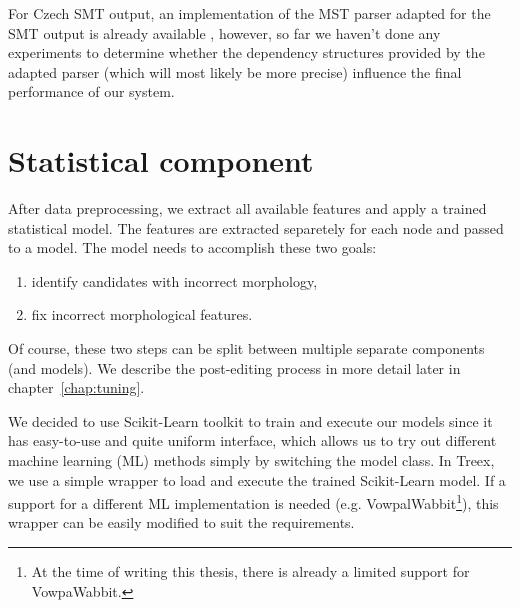 For Czech SMT output, an implementation of the MST parser adapted for the SMT output
is already available \citep{biblio:RoDuUsingParallel2012}, however, so far we haven't done any experiments
to determine whether the dependency structures provided by the adapted parser (which
will most likely be more precise) influence the final performance of our system.



\section{Statistical component}

After data preprocessing, we extract all available features and
apply a trained statistical model. The features are extracted separetely for each node and passed
to a model. The model needs to accomplish these two goals:
\begin{enumerate}
    \item identify candidates with incorrect morphology,
    \item fix incorrect morphological features.
\end{enumerate}
Of course, these two steps can be split between multiple separate components (and models).
We describe the post-editing process in more detail later in chapter~\ref{chap:tuning}.

We decided to use Scikit-Learn \citep{scikit-learn} toolkit to train and execute our models since
it has easy-to-use and quite uniform interface, which allows us to try out different
machine learning (ML) methods simply by switching the model class. In Treex, we use a simple
wrapper to load and execute the trained Scikit-Learn model. If a support for a different ML implementation
is needed (e.g. VowpalWabbit\footnote{At the time of writing this thesis, there is already
a limited support for VowpaWabbit.}), this wrapper can be easily modified to suit the requirements.

